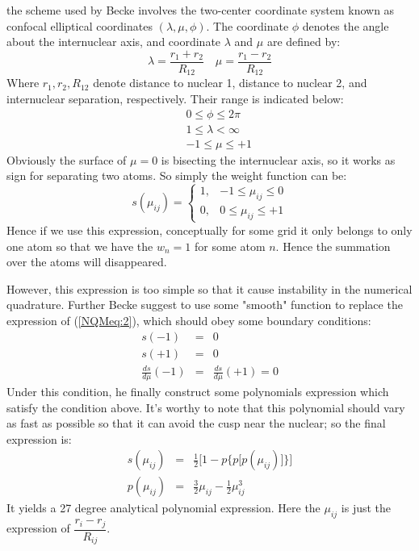 the scheme used by Becke involves the two-center coordinate
system known as confocal elliptical coordinates $(\lambda, \mu,
\phi)$. The coordinate $\phi$ denotes the angle about the
internuclear axis, and coordinate $\lambda$ and $\mu$ are defined
by:
\begin{equation}\label{}
 \lambda = \frac{r_{1}+ r_{2}}{R_{12}} \quad
\mu = \frac{r_{1} - r_{2}}{R_{12}}
\end{equation}
Where $r_{1}, r_{2}, R_{12}$ denote distance to nuclear 1, distance
to nuclear 2, and internuclear separation, respectively. Their range
is indicated below:
\begin{eqnarray}
   & & 0 \leq \phi \leq 2\pi \nonumber \\
   & & 1 \leq \lambda <\infty \nonumber \\
   & & -1 \leq \mu \leq +1
\end{eqnarray}
Obviously the surface of $\mu=0$ is bisecting the internuclear axis,
so it works as sign for separating two atoms. So simply the weight
function can be:
\begin{equation}\label{NQMeq:2}
s(\mu_{ij})=\begin{cases}
1, & -1 \leq \mu_{ij} \leq 0 \\
0, & 0 \leq \mu_{ij} \leq +1
\end{cases}
\end{equation}
Hence if we use this expression, conceptually for some grid it only
belongs to only one atom so that we have the $w_{n} = 1$ for some
atom $n$. Hence the summation over the atoms will disappeared.

However, this expression is too simple so that it cause instability
in the numerical quadrature. Further Becke suggest to use some
"smooth" function to replace the expression of (\ref{NQMeq:2}), which
should obey some boundary conditions:
\begin{eqnarray}\label{NQMeq:5}
  s(-1) &=& 0 \nonumber \\
  s(+1) &=& 0 \nonumber \\
  \frac{ds}{d \mu}(-1) &=& \frac{ds}{d \mu}(+1) = 0
\end{eqnarray}
Under this condition, he finally construct some polynomials
expression which satisfy the condition above. It's worthy to note
that this polynomial should vary as fast as possible so that it can
avoid the cusp near the nuclear; so the final expression is:
\begin{eqnarray}\label{NQMeq:3}
  s(\mu_{ij}) &=& \frac{1}{2} \bigg[1- p 
\Big\{p \big[ p(\mu_{ij}) \big] \Big\} \bigg] \nonumber \\
  p(\mu_{ij}) &=& \frac{3}{2}\mu_{ij} - \frac{1}{2}\mu^{3}_{ij}
\end{eqnarray}
It yields a 27 degree analytical polynomial expression. Here the
$\mu_{ij}$ is just the expression of $\dfrac{r_{i} - r_{j}}{R_{ij}}$. 

